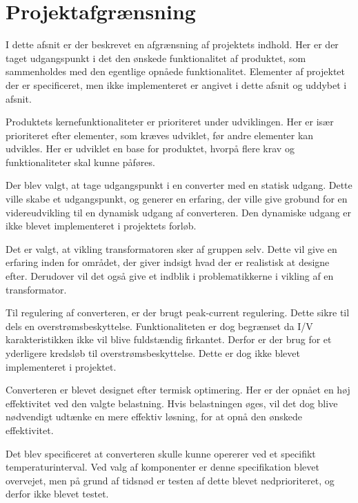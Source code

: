 
\chapter{Projektafgrænsning}
I dette afsnit er der beskrevet en afgrænsning af projektets indhold. Her er der taget udgangspunkt i det den ønskede funktionalitet af produktet, som sammenholdes med den egentlige opnåede funktionalitet. Elementer af projektet der er specificeret, men ikke implementeret er angivet i dette afsnit og uddybet i afsnit. 

Produktets kernefunktionaliteter er prioriteret under udviklingen. Her er især prioriteret efter elementer, som kræves udviklet, før andre elementer kan udvikles. Her er udviklet en base for produktet, hvorpå flere krav og funktionaliteter skal kunne påføres.

Der blev valgt, at tage udgangspunkt i en converter med en statisk udgang. Dette ville skabe et udgangspunkt, og generer en erfaring, der ville give grobund for en videreudvikling til en dynamisk udgang af converteren. Den dynamiske udgang er ikke blevet implementeret i projektets forløb.

Det er valgt, at vikling transformatoren sker af gruppen selv. Dette vil give en erfaring inden for området, der giver indsigt hvad der er realistisk at designe efter. Derudover vil det også give et indblik i problematikkerne i vikling af en transformator.

Til regulering af converteren, er der brugt peak-current regulering. Dette sikre til dels en overstrømsbeskyttelse. Funktionaliteten er dog begrænset da I/V karakteristikken ikke vil blive fuldstændig firkantet. Derfor er der brug for et yderligere kredsløb til overstrømsbeskyttelse. Dette er dog ikke blevet implementeret i projektet. 

Converteren er blevet designet efter termisk optimering. Her er der opnået en høj effektivitet ved den valgte belastning. Hvis belastningen øges, vil det dog blive nødvendigt udtænke en mere effektiv løsning, for at opnå den ønskede effektivitet. 

Det blev specificeret at converteren skulle kunne opererer ved et specifikt temperaturinterval. Ved valg af komponenter er denne specifikation blevet overvejet, men på grund af tidsnød er testen af dette blevet nedprioriteret, og derfor ikke blevet testet.



